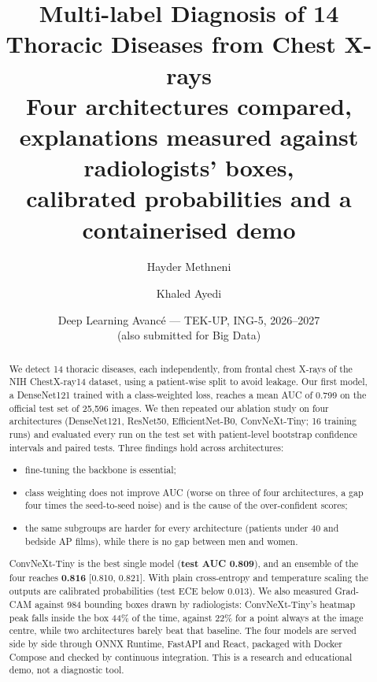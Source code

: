 \documentclass[11pt,a4paper]{article}
\title{Multi-label Diagnosis of 14 Thoracic Diseases from Chest X-rays\\
\large Four architectures compared, explanations measured against radiologists' boxes,\\ calibrated probabilities and a containerised demo}
\author{Hayder Methneni \and Khaled Ayedi}
\date{Deep Learning Avanc\'e --- TEK-UP, ING-5, 2026--2027\\ (also submitted for Big Data)}
\begin{document}
\maketitle

\begin{abstract}
We detect 14 thoracic diseases, each independently, from frontal chest X-rays of the NIH ChestX-ray14 dataset, using a patient-wise split to avoid leakage. Our first model, a DenseNet121 trained with a class-weighted loss, reaches a mean AUC of 0.799 on the official test set of 25{,}596 images. We then repeated our ablation study on four architectures (DenseNet121, ResNet50, EfficientNet-B0, ConvNeXt-Tiny; 16 training runs) and evaluated every run on the test set with patient-level bootstrap confidence intervals and paired tests. Three findings hold across architectures:
\begin{itemize}
  \item fine-tuning the backbone is essential;
  \item class weighting does not improve AUC (worse on three of four architectures, a gap four times the seed-to-seed noise) and is the cause of the over-confident scores;
  \item the same subgroups are harder for every architecture (patients under 40 and bedside AP films), while there is no gap between men and women.
\end{itemize}
ConvNeXt-Tiny is the best single model (\textbf{test AUC 0.809}), and an ensemble of the four reaches \textbf{0.816} [0.810, 0.821]. With plain cross-entropy and temperature scaling the outputs are calibrated probabilities (test ECE below 0.013). We also measured Grad-CAM against 984 bounding boxes drawn by radiologists: ConvNeXt-Tiny's heatmap peak falls inside the box 44\% of the time, against 22\% for a point always at the image centre, while two architectures barely beat that baseline. The four models are served side by side through ONNX Runtime, FastAPI and React, packaged with Docker Compose and checked by continuous integration. This is a research and educational demo, not a diagnostic tool.
\end{abstract}
\end{document}
